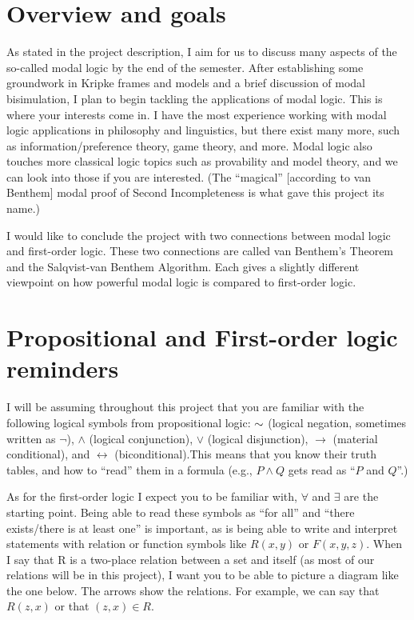 \section{Overview and goals}
As stated in the project description, I aim for us to discuss many aspects of the so-called modal logic by the end of the semester. 
After establishing some groundwork in Kripke frames and models and a brief discussion of modal bisimulation, I plan to begin tackling 
the applications of modal logic. This is where your interests come in. I have the most experience working with modal logic 
applications in philosophy and linguistics, but there exist many more, such as information/preference theory, game theory, and more. 
Modal logic also touches more classical logic topics such as provability and model theory, and we can look into those if you are interested. 
(The ``magical'' [according to van Benthem] modal proof of Second Incompleteness is what gave this project its name.)

I would like to conclude the project with two connections between modal logic and first-order logic. 
These two connections are called van Benthem's Theorem and the Salqvist-van Benthem Algorithm. 
Each gives a slightly different viewpoint on how powerful modal logic is compared to first-order logic.

\section{Propositional and First-order logic reminders}

I will be assuming throughout this project that you are familiar with the following logical symbols from propositional logic: $\mathord{\sim}$ (logical negation,
sometimes written as $\neg$), $\wedge$ (logical conjunction), $\vee$ (logical disjunction), $\rightarrow$ (material conditional), and $\leftrightarrow$ 
(biconditional).This means that you know their truth tables, and how to “read” them in a formula (e.g., $P \wedge Q$
gets read as ``$P$ and $Q$''.)

As for the first-order logic I expect you to be familiar with, $\forall$ and $\exists$ are the starting point. 
Being able to read these symbols as ``for all'' and ``there exists/there is at least one'' is important, as is being able to write and interpret statements with
relation or function symbols like $R(x,y)$ or $F(x, y, z)$. When I say that R is a two-place relation between a 
set and itself (as most of our relations will be in this project), I want you to be able to picture a 
diagram like the one below. The arrows show the relations. For example, we can say that $R(z,x)$ or that $(z,x) \in R$.

